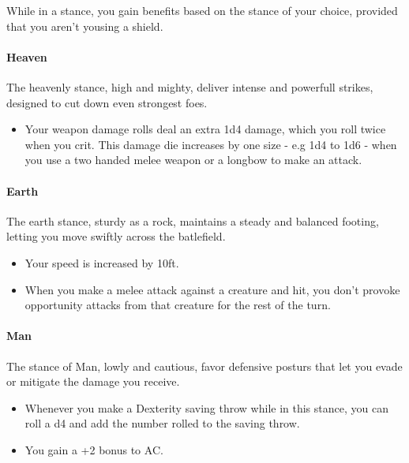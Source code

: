 \documentclass[letterpaper,twocolumn,openany,nodeprecatedcode]{dndbook}
\begin{document}
\noindent While in a stance, you gain benefits based on the stance of your choice, provided that you aren't yousing a 
shield.
\vspace{\baselineskip}

\paragraph{Heaven}
The heavenly stance, high and mighty, deliver intense and powerfull strikes, designed to cut 
down even strongest foes.

\begin{itemize}
    \item Your weapon damage rolls deal an extra 1d4 damage, which you roll twice when you crit. This damage
    die increases by one size - e.g 1d4 to 1d6 - when you use a two handed melee weapon or a longbow to make
    an attack.
\end{itemize}
\vspace{\baselineskip}

\paragraph{Earth}
The earth stance, sturdy as a rock, maintains a steady and balanced footing, letting you move
swiftly across the batlefield.

\begin{itemize}
    \item Your speed is increased by 10ft.
    \item When you make a melee attack against a creature and hit, you don't provoke opportunity attacks from 
    that creature for the rest of the turn. %
\end{itemize}
\vspace{\baselineskip}

\paragraph{Man}
The stance of Man, lowly and cautious, favor defensive posturs that let you evade or mitigate the
damage you receive.

\begin{itemize}
    \item Whenever you make a Dexterity saving throw while in this stance, you can roll a d4 and add the number
    rolled to the saving throw. 
    \item You gain a +2 bonus to AC.
\end{itemize}
\end{document}
